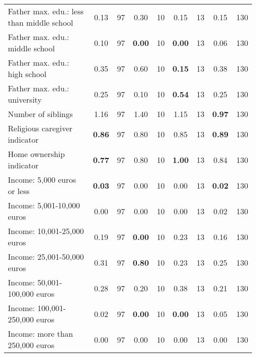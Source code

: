 \begin{tabular}{l c c c c c c c c}
Father max. edu.: less than middle school &      0.13 &        97 &      0.30 &        10 &      0.15 &        13 &      0.15 &       130 \\
Father max. edu.: middle school &      0.10 &        97 & \textbf{     0.00} &        10 & \textbf{     0.00} &        13 &      0.06 &       130 \\
Father max. edu.: high school &      0.35 &        97 &      0.60 &        10 & \textbf{     0.15} &        13 &      0.38 &       130 \\
Father max. edu.: university &      0.25 &        97 &      0.10 &        10 & \textbf{     0.54} &        13 &      0.25 &       130 \\
Number of siblings &      1.16 &        97 &      1.40 &        10 &      1.15 &        13 & \textbf{     0.97} &       130 \\
Religious caregiver indicator & \textbf{     0.86} &        97 &      0.80 &        10 &      0.85 &        13 & \textbf{     0.89} &       130 \\
Home ownership indicator & \textbf{     0.77} &        97 &      0.80 &        10 & \textbf{     1.00} &        13 &      0.84 &       130 \\
Income: 5,000 euros or less & \textbf{     0.03} &        97 &      0.00 &        10 &      0.00 &        13 & \textbf{     0.02} &       130 \\
Income: 5,001-10,000 euros &      0.00 &        97 &      0.00 &        10 &      0.00 &        13 &      0.02 &       130 \\
Income: 10,001-25,000 euros &      0.19 &        97 & \textbf{     0.00} &        10 &      0.23 &        13 &      0.16 &       130 \\
Income: 25,001-50,000 euros &      0.31 &        97 & \textbf{     0.80} &        10 &      0.23 &        13 &      0.25 &       130 \\
Income: 50,001-100,000 euros &      0.28 &        97 &      0.20 &        10 &      0.38 &        13 &      0.21 &       130 \\
Income: 100,001-250,000 euros &      0.02 &        97 & \textbf{     0.00} &        10 & \textbf{     0.00} &        13 &      0.05 &       130 \\
Income: more than 250,000 euros &      0.00 &        97 &      0.00 &        10 &      0.00 &        13 &      0.00 &       130 \\
\bottomrule
\end{tabular}
